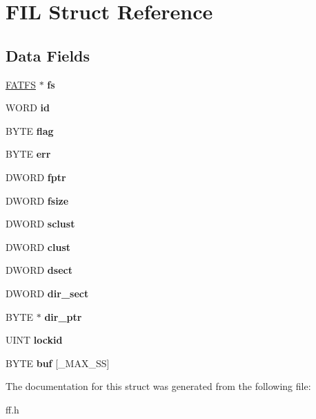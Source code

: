 \hypertarget{struct_f_i_l}{}\section{F\+IL Struct Reference}
\label{struct_f_i_l}
\subsection*{Data Fields}
\begin{DoxyCompactItemize}
\item 
\mbox{\label{struct_f_i_l_a42376a6797a06228911c8b836c1e9030}} 
\hyperlink{struct_f_a_t_f_s}{F\+A\+T\+FS} $\ast$ {\bfseries fs}
\item 
\mbox{\label{struct_f_i_l_af7cae0063b0045fb7078b560101ba8f2}} 
W\+O\+RD {\bfseries id}
\item 
\mbox{\label{struct_f_i_l_ac409508881f5a16f2998ae675072b376}} 
B\+Y\+TE {\bfseries flag}
\item 
\mbox{\label{struct_f_i_l_aea440945db26de9c4a88065c0c887fda}} 
B\+Y\+TE {\bfseries err}
\item 
\mbox{\label{struct_f_i_l_a75d29cf9257c827d117887b9f924c4a9}} 
D\+W\+O\+RD {\bfseries fptr}
\item 
\mbox{\label{struct_f_i_l_aa00790d40d7b0081c345fd4f76e22b70}} 
D\+W\+O\+RD {\bfseries fsize}
\item 
\mbox{\label{struct_f_i_l_ad308b74c8d6975c6a9c30d90b4124c40}} 
D\+W\+O\+RD {\bfseries sclust}
\item 
\mbox{\label{struct_f_i_l_aa41312aba551b9a6d1c9d3c8c7d2734b}} 
D\+W\+O\+RD {\bfseries clust}
\item 
\mbox{\label{struct_f_i_l_ab3d4165d6fd32ac71a130d835fbf0b4d}} 
D\+W\+O\+RD {\bfseries dsect}
\item 
\mbox{\label{struct_f_i_l_ab203794f939ad4480e81dfa488770783}} 
D\+W\+O\+RD {\bfseries dir\+\_\+sect}
\item 
\mbox{\label{struct_f_i_l_a5af9e9fb312b629220eaf684dd28c4a9}} 
B\+Y\+TE $\ast$ {\bfseries dir\+\_\+ptr}
\item 
\mbox{\label{struct_f_i_l_a9488efc484439c0d4d7a9b65ab80f16d}} 
U\+I\+NT {\bfseries lockid}
\item 
\mbox{\label{struct_f_i_l_a7a95fb86588663e48309b5cded7e207b}} 
B\+Y\+TE {\bfseries buf} \mbox{[}\+\_\+\+M\+A\+X\+\_\+\+SS\mbox{]}
\end{DoxyCompactItemize}


The documentation for this struct was generated from the following file\+:\begin{DoxyCompactItemize}
\item 
ff.\+h\end{DoxyCompactItemize}
